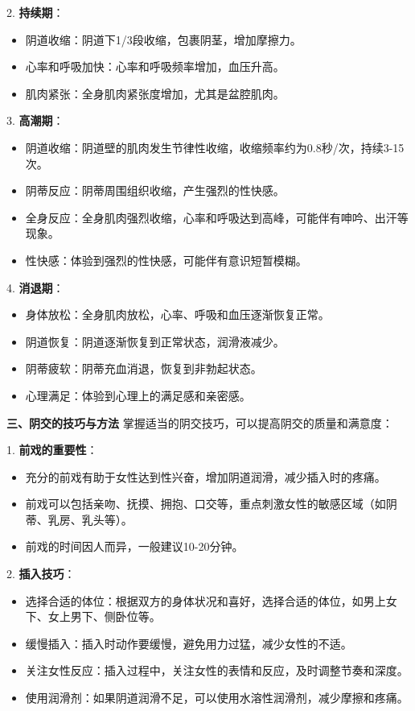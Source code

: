 \documentclass[12pt,UTF8]{ctexbook}
\begin{document}
2. \textbf{持续期}：
\begin{itemize}
	\item 阴道收缩：阴道下1/3段收缩，包裹阴茎，增加摩擦力。
	\item 心率和呼吸加快：心率和呼吸频率增加，血压升高。
	\item 肌肉紧张：全身肌肉紧张度增加，尤其是盆腔肌肉。
\end{itemize}

3. \textbf{高潮期}：
\begin{itemize}
	\item 阴道收缩：阴道壁的肌肉发生节律性收缩，收缩频率约为0.8秒/次，持续3-15次。
	\item 阴蒂反应：阴蒂周围组织收缩，产生强烈的性快感。
	\item 全身反应：全身肌肉强烈收缩，心率和呼吸达到高峰，可能伴有呻吟、出汗等现象。
	\item 性快感：体验到强烈的性快感，可能伴有意识短暂模糊。
\end{itemize}

4. \textbf{消退期}：
\begin{itemize}
	\item 身体放松：全身肌肉放松，心率、呼吸和血压逐渐恢复正常。
	\item 阴道恢复：阴道逐渐恢复到正常状态，润滑液减少。
	\item 阴蒂疲软：阴蒂充血消退，恢复到非勃起状态。
	\item 心理满足：体验到心理上的满足感和亲密感。
\end{itemize}

\textbf{三、阴交的技巧与方法}
掌握适当的阴交技巧，可以提高阴交的质量和满意度：

1. \textbf{前戏的重要性}：
\begin{itemize}
	\item 充分的前戏有助于女性达到性兴奋，增加阴道润滑，减少插入时的疼痛。
	\item 前戏可以包括亲吻、抚摸、拥抱、口交等，重点刺激女性的敏感区域（如阴蒂、乳房、乳头等）。
	\item 前戏的时间因人而异，一般建议10-20分钟。
\end{itemize}

2. \textbf{插入技巧}：
\begin{itemize}
	\item 选择合适的体位：根据双方的身体状况和喜好，选择合适的体位，如男上女下、女上男下、侧卧位等。
	\item 缓慢插入：插入时动作要缓慢，避免用力过猛，减少女性的不适。
	\item 关注女性反应：插入过程中，关注女性的表情和反应，及时调整节奏和深度。
	\item 使用润滑剂：如果阴道润滑不足，可以使用水溶性润滑剂，减少摩擦和疼痛。
\end{itemize}
\end{document}
